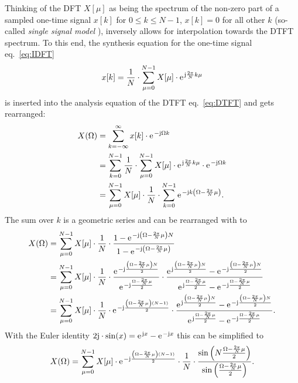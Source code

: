 \documentclass[11pt,a4paper,DIV=12]{scrartcl}
\begin{document}
%
Thinking of the DFT $X[\mu]$ as being the spectrum of the non-zero part of a
sampled one-time signal $x[k]$ for $0\leq k\leq N-1$, $x[k]=0$ for all other
$k$ (so-called \textit{single signal model} \cite{Moeser2011}), inversely allows
for interpolation towards the DTFT spectrum.
%
To this end, the synthesis equation for the one-time signal eq.~\eqref{eq:IDFT}
%
\begin{equation}
x[k]=\frac{1}{N}\cdot\sum_{\mu=0}^{N-1}X[\mu]\cdot\e^{\im\frac{2\pi}{N}k\mu}
\end{equation}
%
is inserted into the analysis equation of the DTFT eq.~\eqref{eq:DTFT} and gets
rearranged:
\begin{align}
X(\Omega)&=\sum_{k=-\infty}^\infty x[k]\cdot\e^{-\im\Omega k}\\
&=\sum_{k=0}^{N-1}\frac{1}{N}\cdot\sum_{\mu=0}^{N-1}X[\mu]\cdot\e^{\im\frac{2\pi}{N}k\mu}\cdot\e^{-\im\Omega k}\\
&=\sum_{\mu=0}^{N-1}X[\mu]\cdot\frac{1}{N}\cdot\sum_{k=0}^{N-1}\e^{-\im k\left(\Omega-\frac{2\pi}{N}\mu\right)}.
\end{align}
%
The sum over $k$ is a geometric series and can be rearranged with
\cite[(3-39)]{Lyons2011} to
%
\begin{align}
X(\Omega)&=\sum_{\mu=0}^{N-1}X[\mu]\cdot\frac{1}{N}\cdot\frac{1-\e^{-\im\left(\Omega-\frac{2\pi}{N}\mu\right)N}}{1-\e^{-\im\left(\Omega-\frac{2\pi}{N}\mu\right)}}\\
&=\sum_{\mu=0}^{N-1}X[\mu]\cdot\frac{1}{N}\cdot\frac{\e^{-\im\frac{\left(\Omega-\frac{2\pi}{N}\mu\right)N}{2}}}{\e^{-\im\frac{\Omega-\frac{2\pi}{N}\mu}{2}}}\cdot\frac{\e^{\im\frac{\left(\Omega-\frac{2\pi}{N}\mu\right)N}{2}}-\e^{-\im\frac{\left(\Omega-\frac{2\pi}{N}\mu\right)N}{2}}}{\e^{\im\frac{\Omega-\frac{2\pi}{N}\mu}{2}}-\e^{-\im\frac{\Omega-\frac{2\pi}{N}\mu}{2}}}\\
&=\sum_{\mu=0}^{N-1}X[\mu]\cdot\frac{1}{N}\cdot\e^{-\im\frac{\left(\Omega-\frac{2\pi}{N}\mu\right)(N-1)}{2}}\cdot\frac{\e^{\im\frac{\left(\Omega-\frac{2\pi}{N}\mu\right)N}{2}}-\e^{-\im\frac{\left(\Omega-\frac{2\pi}{N}\mu\right)N}{2}}}{\e^{\im\frac{\Omega-\frac{2\pi}{N}\mu}{2}}-\e^{-\im\frac{\Omega-\frac{2\pi}{N}\mu}{2}}}.
\end{align}
%
With the Euler identity $2\im\cdot\sin(x)=\e^{\im x}-\e^{-\im x}$ this can be
simplified to \cite[eq.~(2.41)]{Moeser2011}
%
\begin{equation}
X(\Omega)=\sum_{\mu=0}^{N-1}X[\mu]\cdot\e^{-\im\frac{\left(\Omega-\frac{2\pi}{N}\mu\right)(N-1)}{2}}\cdot\frac{1}{N}\cdot\frac{\sin\left(N\frac{\Omega-\frac{2\pi}{N}\mu}{2}\right)}{\sin\left(\frac{\Omega-\frac{2\pi}{N}\mu}{2}\right)}.
\label{eq:DTFT_Interpolation}
\end{equation}
\end{document}
